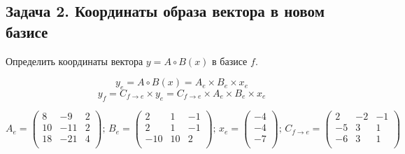 \documentclass[12pt]{article}
\begin{document}
\subsection*{Задача 2. Координаты образа вектора в новом базисе}
Определить координаты вектора $ y = A \circ B(x) $ в базисе $ f $.

$$
	y_e = A \circ B(x) = A_e \times B_e \times x_e
$$
$$
	y_f = C_{f \rightarrow e} \times y_e = C_{f \rightarrow e} \times A_e \times B_e \times x_e
$$

$$
	A_e =
	\begin{pmatrix}
		8  & -9  & 2 \\
		10 & -11 & 2 \\
		18 & -21 & 4 \\
	\end{pmatrix}\text{; }
	B_e =
	\begin{pmatrix}
		2   & 1  & -1 \\
		2   & 1  & -1 \\
		-10 & 10 & 2  \\
	\end{pmatrix}\text{; }
	x_e =
	\begin{pmatrix}
		-4 \\ -4 \\ -7 \\
	\end{pmatrix}\text{; }
	C_{f \rightarrow e} =
	\begin{pmatrix}
		2  & -2 & -1 \\
		-5 & 3  & 1  \\
		-6 & 3  & 1  \\
	\end{pmatrix}
$$
\end{document}
